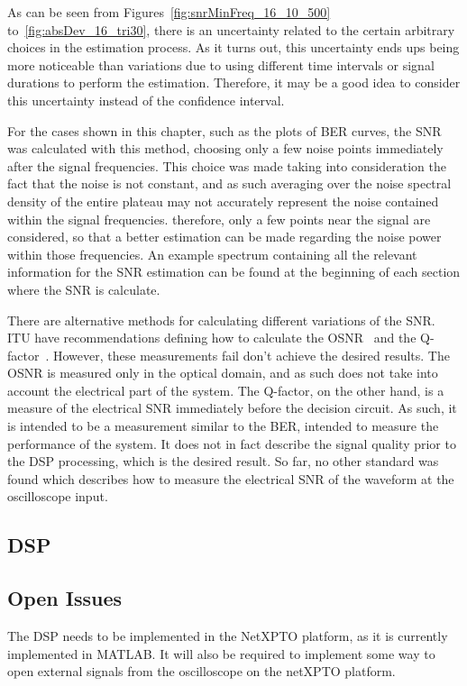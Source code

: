 \begin{refsection}
As can be seen from Figures~\ref{fig:snrMinFreq_16_10_500} 
to~\ref{fig:absDev_16_tri30}, there is an uncertainty related to the certain 
arbitrary choices in the estimation process. As it turns out, this uncertainty 
ends ups being more noticeable than variations due to using different time 
intervals or signal durations to perform the estimation. Therefore, it may be a 
good idea to consider this uncertainty instead of the confidence interval.

For the cases shown in this chapter, such as the plots of BER curves, the SNR was calculated with this method, choosing only a few noise points immediately after the signal frequencies. This choice was made taking into consideration the fact that the noise is not constant, and as such averaging over the noise spectral density of the entire plateau may not accurately represent the noise contained within the signal frequencies. therefore, only a few points near the signal are considered, so that a better estimation can be made regarding the noise power within those frequencies. An example spectrum containing all the relevant information for the SNR estimation can be found at the beginning of each section where the SNR is calculate.

There are alternative methods for calculating different variations of the SNR. 
ITU have recommendations defining how to calculate the OSNR~\cite{itutgsup39} 
and the Q-factor~\cite{ituto201}. However, these measurements fail don't 
achieve the desired results. The OSNR is measured only in the optical domain, 
and as such does not take into account the electrical part of the system. The 
Q-factor, on the other hand, is a measure of the electrical SNR immediately 
before the decision circuit. As such, it is intended to be a measurement 
similar to the BER, intended to measure the performance of the system. It does 
not in fact describe the signal quality prior to the DSP processing, which is 
the desired result. So far, no other standard was found which describes how to 
measure the electrical SNR of the waveform at the oscilloscope input.


\subsection{DSP}

\subsection{Open Issues}
The DSP needs to be implemented in the NetXPTO platform, as it is currently 
implemented in MATLAB.
It will also be required to implement some way to open external signals from 
the oscilloscope on the netXPTO platform.
\newpage




\clearpage
\printbibliography[heading=subbibliography]
\end{refsection}
\cleardoublepage


